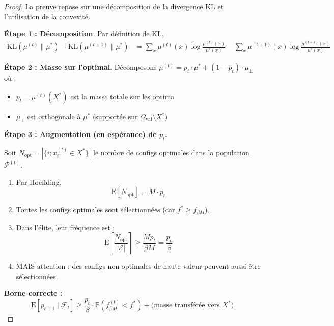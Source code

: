 \documentclass[12pt,a4paper]{article}
\theoremstyle{definition}
\theoremstyle{remark}
\newcommand{\E}{\text{E}}
\newcommand{\KL}{\text{KL}}
\begin{document}
	\begin{proof}
		La preuve repose sur une décomposition de la divergence KL et l'utilisation de la convexité.
		
		\textbf{Étape 1 : Décomposition}.
		Par définition de KL,
		\begin{align}
			\KL(\mu^{(t)}\|\mu^*) - \KL(\mu^{(t+1)}\|\mu^*)
			&= \sum_{x} \mu^{(t)}(x) \log\frac{\mu^{(t)}(x)}{\mu^*(x)} - \sum_{x} \mu^{(t+1)}(x) \log\frac{\mu^{(t+1)}(x)}{\mu^*(x)}
		\end{align}
		
		\textbf{Étape 2 : Masse sur l'optimal}.
		Décomposons $\mu^{(t)} = p_t \cdot \mu^* + (1-p_t) \cdot \mu_\perp$ où :
		\begin{itemize}
			\item $p_t = \mu^{(t)}(X^*)$ est la masse totale sur les optima
			\item $\mu_\perp$ est orthogonale à $\mu^*$ (supportée sur $\Omega_{\text{val}} \setminus X^*$)
		\end{itemize}
		
		\textbf{Étape 3 : Augmentation (en espérance) de $p_t$.}

        Soit $N_{\text{opt}} = |\{i : x_i^{(t)} \in X^*\}|$ le nombre de configs optimales 
        dans la population $\mathcal{P}^{(t)}$.

    \begin{enumerate}
        \item Par Hoeffding, 
    \begin{equation}
        \E[N_{\text{opt}}] = M \cdot p_t
    \end{equation}
    
        \item Toutes les configs optimales sont sélectionnées (car $f^* \geq f_{\beta M}$).
    
        \item Dans l'élite, leur fréquence est :
    \begin{equation}
        \E\left[\frac{N_{\text{opt}}}{|\mathcal{E}|}\right] 
        \geq \frac{M p_t}{\beta M} = \frac{p_t}{\beta}
    \end{equation}
    
         \item MAIS attention : des configs non-optimales de haute valeur 
          peuvent aussi être sélectionnées.
    \end{enumerate}

        \textbf{Borne correcte :}
    \begin{equation}
         \E[p_{t+1} \mid \mathcal{F}_t] 
         \geq \frac{p_t}{\beta} \cdot \mathbb{P}(f_{\beta M}^{(t)} < f^*)
        + \text{(masse transférée vers } X^*)
    \end{equation}


\end{proof}
\end{document}

